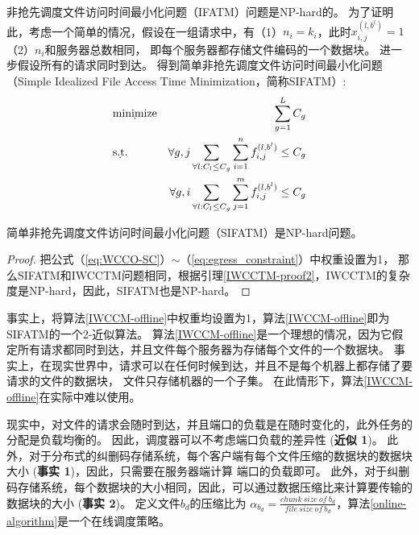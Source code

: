 非抢先调度文件访问时间最小化问题（IFATM）问题是NP-hard的。
为了证明此，考虑一个简单的情况，假设在一组请求中，有（1）$n_i = k_i $，此时$x_{i,j} ^{(l,b^l)}=1$（2）$n_i $和服务器总数相同，
即每个服务器都存储文件编码的一个数据块。
进一步假设所有的请求同时到达。
得到简单非抢先调度文件访问时间最小化问题（Simple Idealized File Access Time
Minimization，简称SIFATM）:
 \begin{eqnarray}
&\d {\rm minimize} & \sum_{g=1}^{L} C_{g} \label{eq:simple_ECSF-SC} \\
& \d{\rm s.t.} &\forall g,j\sum_{\forall l:C_l \leq C_g}\sum_{i=1}^{n}f_{i,j}^{(l,b^l)}\leq C_g  \label{eq:simple_ingress_constraint}\\
&&\forall g,i\sum_{\forall l:C_l \leq C_g}\sum_{j=1}^{m}f_{i,j}^{(l,b^l)} \leq C_g   \label{eq:simple_egress_constraint}
\end{eqnarray}

 \begin{lemma}\label{theorem-SIFATM}
简单非抢先调度文件访问时间最小化问题（SIFATM）是NP-hard问题。
\end{lemma}
\begin{proof}
把公式（\ref{eq:WCCO-SC}）$\sim$（\ref{eq:egress_constraint}）中权重设置为1，
那么SIFATM和IWCCTM问题相同，根据引理\ref{IWCCTM-proof2}，IWCCTM的复杂度是NP-hard，因此，SIFATM也是NP-hard。
\end{proof}

事实上，将算法\ref{IWCCM-offline}中权重均设置为1，算法\ref{IWCCM-offline}即为SIFATM的一个2-近似算法。
算法\ref{IWCCM-offline}是一个理想的情况，因为它假定所有请求都同时到达，并且文件每个服务器为存储每个文件的一个数据块。
事实上，在现实世界中，请求可以在任何时候到达，并且不是每个机器上都存储了要请求的文件的数据块，
文件只存储机器的一个子集。 
在此情形下，算法\ref{IWCCM-offline}在实际中难以使用。

现实中，对文件的请求会随时到达，并且端口的负载是在随时变化的，此外任务的分配是负载均衡的\cite{dean2008mapreduce,dogar2014decentralized,luo2016towards}。
因此，调度器可以不考虑端口负载的差异性 (\textbf{近似 1})。
此外，对于分布式的纠删码存储系统，每个客户端有每个文件压缩的数据块的数据块大小 (\textbf{事实 1})，因此，只需要在服务器端计算
端口的负载即可。
此外，对于纠删码存储系统，每个数据块的大小相同，因此，可以通过数据压缩比来计算要传输的数据块的大小 (\textbf{事实 2})。
定义文件$b_d$的压缩比为 $\alpha_{b_d}=\frac{chunk\ size \ of \ b_d}{file \ size \ of \ b_d}$，算法\ref{online-algorithm}是一个在线调度策略。

